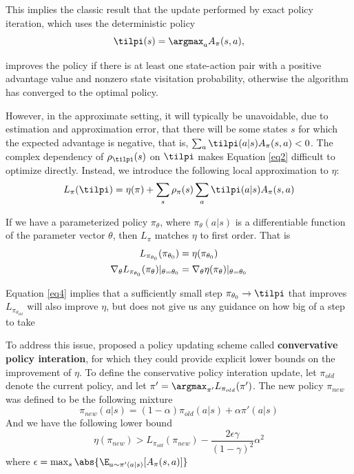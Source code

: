 \documentclass[11pt]{article}
\begin{document}
This implies the classic result that the update performed by exact policy iteration, which uses the
deterministic policy
\begin{equation*}
\tilpi(s)=\argmax_aA_\pi(s,a),
\end{equation*}

improves the policy if there is at least one state-action pair with a positive advantage value and
nonzero state visitation probability, otherwise the algorithm has converged to the optimal policy.

However, in the approximate setting, it will typically be unavoidable, due to estimation and
approximation error, that there will be some states \(s\) for which the expected advantage is negative,
that is, \(\sum_a\tilpi(a|s)A_\pi(s,a)<0\). The complex dependency of \(\rho_{\tilpi}(s)\) on \(\tilpi\) makes Equation \eqref{eq2}  difficult to
optimize directly. Instead, we introduce the following local approximation to \(\eta\):
\begin{equation*}
L_\pi(\tilpi)=\eta(\pi)+\sum_s\rho_\pi(s)\sum_a\tilpi(a|s)A_\pi(s,a)
\end{equation*}

If we have a parameterized policy \(\pi_\theta\), where \(\pi_\theta(a|s)\) is a differentiable function of the parameter vector
\(\theta\), then \(L_\pi\) matches \(\eta\) to first order. That is
\begin{gather}
L_{\pi_{\theta_0}}(\pi_{\theta_0})=\eta(\pi_{\theta_0})\notag\\
\nabla_\theta L_{\pi_{\theta_0}}(\pi_\theta)|_{\theta=\theta_0}=\nabla_\theta\eta(\pi_\theta)|_{\theta=\theta_0}\label{eq4}
\end{gather}

Equation \eqref{eq4} implies that a sufficiently small step \(\pi_{\theta_0}\to\tilpi\) that improves
\(L_{\pi_{\theta_{old}}}\) will also improve \(\eta\), but does not give us any guidance on how big of a step to take

To address this issue, \cite{645531.656005} proposed a policy updating scheme called \textbf{convervative
policy interation}, for which they could provide explicit lower bounds on the improvement of \(\eta\). To
define the conservative policy interation update, let \(\pi_{old}\) denote the current policy, and let
\(\pi'=\argmax_{\pi'}L_{\pi_{old}}(\pi')\). The new policy \(\pi_{new}\) was defined to be the following mixture
\begin{equation*}
\pi_{new}(a|s)=(1-\alpha)\pi_{old}(a|s)+\alpha\pi'(a|s)
\end{equation*}
And we have the following lower bound
\begin{equation}
\label{eq6}
\eta(\pi_{new})>L_{\pi_{old}}(\pi_{new})-\frac{2\epsilon\gamma}{(1-\gamma)^2}\alpha^2
\end{equation}
where \(\epsilon=\max_s\abs{\E_{a\sim\pi'(a|s)}[A_\pi(s,a)]}\)
\end{document}
